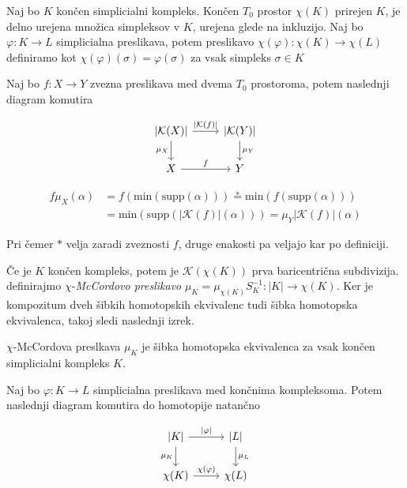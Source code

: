 \documentclass[mat1]{fmfdelo}
\begin{document}
\begin{definicija}
    Naj bo $K$ končen simplicialni kompleks. Končen $T_0$
    prostor $\chi(K)$ prirejen $K$, je delno urejena množica simpleksov v $K$, urejena glede na inkluzijo.
    Naj bo $\varphi:K\rightarrow L$ simplicialna preslikava, potem preslikavo  $\chi(\varphi):\chi(K)\rightarrow \chi(L)$ definiramo kot 
    $\chi(\varphi)(\sigma)=\varphi(\sigma)$ za vsak simpleks $\sigma \in K$
\end{definicija}

\begin{lema}
    Naj bo $f :X\rightarrow Y$ zvezna preslikava med dvema $T_0$ prostoroma, potem naslednji diagram komutira
    
    \[\begin{tikzcd}
        {|\mathcal{K}(X)|}\arrow{r}{|\mathcal{K}(f)|} \arrow[swap]{d}{\mu_X} & {|\mathcal{K}(Y)|} \arrow{d}{\mu_Y} \\
        X \arrow{r}{f} & Y
    \end{tikzcd}
    \]
    
    \label{lem:komutira}
\end{lema}


\begin{dokaz}
    \begin{align*}
        f\mu_X(\alpha)&=f(\text{min}(\text{supp}(\alpha)))\overset{*}{=}\text{min}(f(\text{supp}(\alpha))) \\
        &=\text{min}(\text{supp}(|\mathcal{K}(f)|(\alpha)))=\mu_Y|\mathcal{K}(f)|(\alpha)
    \end{align*}

    Pri čemer $*$ velja zaradi zveznosti $f$, druge enakosti pa veljajo kar po definiciji.
\end{dokaz}

Če je $K$ končen kompleks, potem je $\mathcal{K}(\chi(K))$ prva baricentrična subdivizija.
definirajmo $\chi$-\textit{McCordovo preslikavo} $\mu_K=\mu_{\chi(K)}S_K^{-1}: |K|\rightarrow \chi(K)$. 
Ker je kompozitum dveh šibkih homotopskih ekvivalenc tudi šibka homotopska ekvivalenca, takoj sledi naslednji izrek.

\begin{izrek}
    $\chi$-McCordova preslkava $\mu_K$ je šibka homotopska
    ekvivalenca za vsak končen simplicialni kompleks $K$.
    \label{iz:xsibka}
\end{izrek}


\begin{trditev}
    Naj bo $\varphi: K\rightarrow L$ simplicialna preslikava med končnima kompleksoma. Potem naslednji diagram komutira do homotopije natančno
  
\[\begin{tikzcd}
    {|K|} \arrow{r}{|\varphi|} \arrow[swap]{d}{\mu_K} & {|L|} \arrow{d}{\mu_L} \\
    \chi(K) \arrow{r}{\chi(\varphi)} & \chi(L)
    \end{tikzcd}
    \]
\end{trditev}
\end{document}
